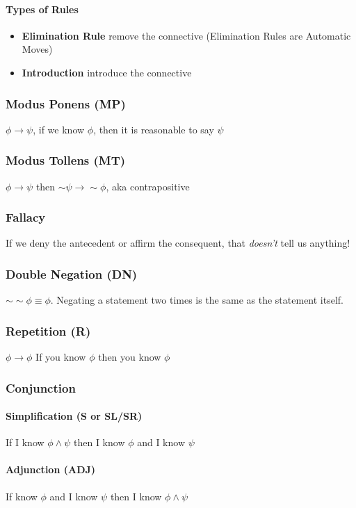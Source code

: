 \documentclass[10pt]{article}
\begin{document}
\paragraph{Types of Rules}
\begin{itemize}
    \item \textbf{Elimination Rule} remove the connective (Elimination
     Rules are Automatic Moves)
    \item \textbf{Introduction} introduce the connective
\end{itemize}

\subsubsection{Modus Ponens (MP)} $\phi \rightarrow \psi$, if we know $\phi$, then it is reasonable to say $\psi$
\subsubsection{Modus Tollens (MT)} $\phi \rightarrow \psi$ then $\sim\psi \rightarrow \sim\phi$, aka contrapositive
\subsubsection*{Fallacy} If we deny the antecedent or affirm the consequent, that \textit{doesn't} tell us anything!
\subsubsection{Double Negation (DN)} $\sim\sim\phi \equiv \phi$. Negating a statement two times is the same as the statement itself.
\subsubsection{Repetition (R)} $\phi \rightarrow \phi$ If you know $\phi$ then you know $\phi$

\subsubsection{Conjunction}
\paragraph{Simplification (S or SL/SR)} If I know $\phi\land \psi$ then
 I know $\phi$ and I know $\psi$
\paragraph{Adjunction (ADJ)} If know $\phi$ and I know $\psi$ then I
 know $\phi\land\psi$
\end{document}
